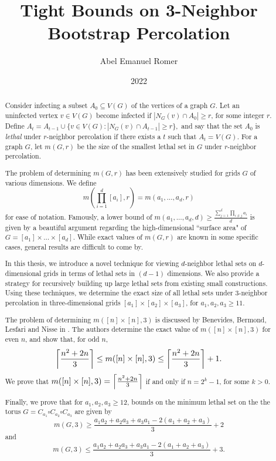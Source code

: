 \documentclass[12pt,oneside]{sigmasthesis}
\title{Tight Bounds on 3-Neighbor Bootstrap Percolation}			%
\author{Abel Emanuel Romer}			%
\date{2022}				%
\DeclarePairedDelimiter\ceil{\lceil}{\rceil}
\theoremstyle{definition}
\begin{document}
\frontmatter 	%


\makecommittee	%

\begin{abstract}
Consider infecting a subset $A_0 \subseteq V(G)$ of the vertices of a graph $G$. Let an uninfected vertex $v \in V(G)$ become infected if $|N_G(v) \cap A_0| \geq r$, for some integer $r$. Define $A_t = A_{t-1} \cup \{v \in V(G) : |N_G(v) \cap A_{t-1}| \geq r \},$ and say that the set $A_0$ is \emph{lethal} under $r$-neighbor percolation if there exists a $t$ such that $A_t = V(G)$. For a graph $G$, let $m(G,r)$ be the size of the smallest lethal set in $G$ under $r$-neighbor percolation. 

The problem of determining $m(G,r)$ has been extensively studied for grids $G$ of various dimensions. We define 
$$m\left (\prod_{i=1}^d [a_i], r\right ) = m(a_1, \dots, a_d, r)$$
for ease of notation. Famously, a lower bound of $m(a_1, \dots, a_d, d) \geq \frac{\sum_{j=1}^d \prod_{i \neq j} a_i}{d}$ is given by a beautiful argument regarding the high-dimensional ``surface area" of $G = [a_1] \times \dots \times [a_d]$. While exact values of $m(G,r)$ are known in some specific cases, general results are difficult to come by.

In this thesis, we introduce a novel technique for viewing $d$-neighbor lethal sets on $d$-dimensional grids in terms of lethal sets in $(d-1)$ dimensions. We also provide a strategy for recursively building up large lethal sets from existing small constructions. Using these techniques, we determine the exact size of all lethal sets under 3-neighbor percolation in three-dimensional grids $[a_1] \times [a_2] \times [a_3]$, for $a_1,a_2,a_3 \geq 11$. 

The problem of determining $m([n] \times [n],3)$ is discussed by Benevides, Bermond, Lesfari and Nisse in \cite{benevides:2021}. The authors determine the exact value of $m([n] \times [n],3)$ for even $n$, and show that, for odd $n$,
$$\ceil*{\frac{n^2+2n}{3}} \leq m([n] \times [n],3) \leq \ceil*{\frac{n^2+2n}{3}} + 1.$$
We prove that $m([n] \times [n],3) = \ceil*{\frac{n^2+2n}{3}}$ if and only if $n = 2^k-1$, for some $k >0$.

Finally, we prove that for $a_1,a_2,a_3 \geq 12$, bounds on the minimum lethal set on the the torus $G = C_{a_1} \square C_{a_2} \square C_{a_3}$ are given by
$$m(G,3) \ge \frac{a_1a_2 + a_2a_3 + a_3a_1 -2(a_1+a_2+a_3)}{3} +2$$
and
$$m(G,3) \le \frac{a_1a_2 + a_2a_3 + a_3a_1 -2(a_1+a_2+a_3)}{3} +3.$$
\end{abstract}
\end{document}
